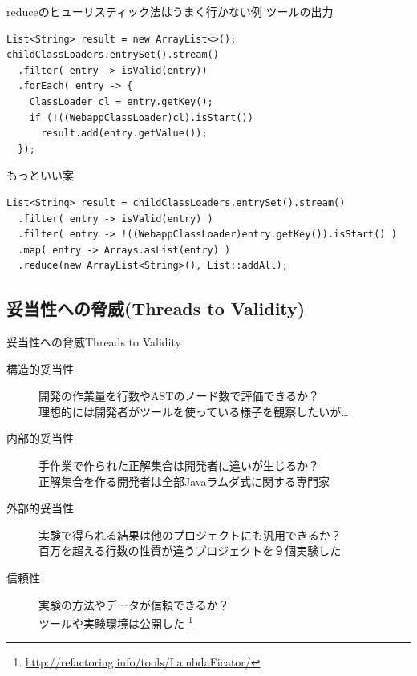 \begin{frame}[fragile]{reduceのヒューリスティック法はうまく行かない例}
ツールの出力
\begin{lstlisting}[morekeywords={map,filter,reduce,forEach,anyMatch,noneMatch}]
List<String> result = new ArrayList<>();
childClassLoaders.entrySet().stream()
  .filter( entry -> isValid(entry))
  .forEach( entry -> {
    ClassLoader cl = entry.getKey();
    if (!((WebappClassLoader)cl).isStart())
      result.add(entry.getValue());
  });
\end{lstlisting}
もっといい案
\begin{lstlisting}[morekeywords={map,filter,reduce,forEach,anyMatch,noneMatch}]
List<String> result = childClassLoaders.entrySet().stream()
  .filter( entry -> isValid(entry) )
  .filter( entry -> !((WebappClassLoader)entry.getKey()).isStart() )
  .map( entry -> Arrays.asList(entry) )
  .reduce(new ArrayList<String>(), List::addAll);
\end{lstlisting}
\end{frame}
\subsection{妥当性への脅威(Threads to Validity)}
\begin{frame}{妥当性への脅威}{Threads to Validity}
\begin{description}
  \item[構造的妥当性] 開発の作業量を行数やASTのノード数で評価できるか？\\
                      理想的には開発者がツールを使っている様子を観察したいが\ldots
  \item[内部的妥当性] 手作業で作られた正解集合は開発者に違いが生じるか？\\
                      正解集合を作る開発者は全部Javaラムダ式に関する専門家
  \item[外部的妥当性] 実験で得られる結果は他のプロジェクトにも汎用できるか？\\
                      百万を超える行数の性質が違うプロジェクトを９個実験した
  \item[信頼性]       実験の方法やデータが信頼できるか？\\
                      ツールや実験環境は公開した
                      \footnote{\url{http://refactoring.info/tools/LambdaFicator/}}
\end{description}
\end{frame}
